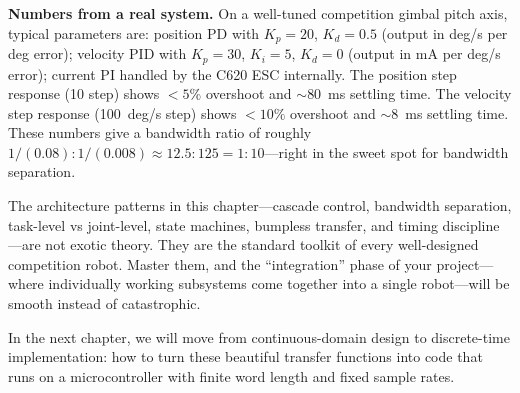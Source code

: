 \begin{mdframed}[linewidth=1pt, innertopmargin=10pt, innerbottommargin=10pt]
\textbf{Numbers from a real system.} On a well-tuned competition gimbal pitch axis, typical parameters are: position PD with $K_p = 20$, $K_d = 0.5$ (output in deg/s per deg error); velocity PID with $K_p = 30$, $K_i = 5$, $K_d = 0$ (output in mA per deg/s error); current PI handled by the C620 ESC internally. The position step response (10\textdegree{} step) shows $<5\%$ overshoot and $\sim$80~ms settling time. The velocity step response (100~deg/s step) shows $<10\%$ overshoot and $\sim$8~ms settling time. These numbers give a bandwidth ratio of roughly $1/(0.08) : 1/(0.008) \approx 12.5 : 125 = 1 : 10$---right in the sweet spot for bandwidth separation.
\end{mdframed}

\vspace{0.5em}

The architecture patterns in this chapter---cascade control, bandwidth separation, task-level vs joint-level, state machines, bumpless transfer, and timing discipline---are not exotic theory. They are the standard toolkit of every well-designed competition robot. Master them, and the ``integration'' phase of your project---where individually working subsystems come together into a single robot---will be smooth instead of catastrophic.

In the next chapter, we will move from continuous-domain design to discrete-time implementation: how to turn these beautiful transfer functions into code that runs on a microcontroller with finite word length and fixed sample rates.
